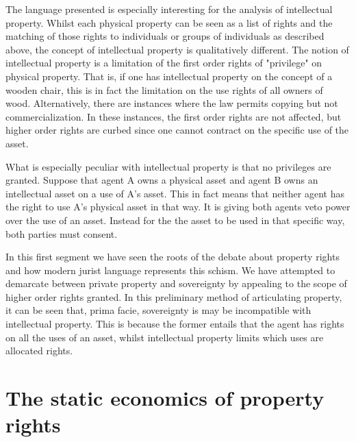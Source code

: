 The language presented is especially interesting for the analysis of intellectual property. Whilst each physical property can be seen as a list of rights and the matching of those rights to individuals or groups of individuals as described above, the concept of intellectual property is qualitatively different. The notion of intellectual property is a limitation of the first order rights of "privilege" on physical property. That is, if one has intellectual property on the concept of a wooden chair, this is in fact the limitation on the use rights of all owners of wood. Alternatively, there are instances where the law permits copying but not commercialization. In these instances, the first order rights are not affected, but higher order rights are curbed since one cannot contract on the specific use of the asset. 

What is especially peculiar with intellectual property is that no privileges are granted. Suppose that agent A owns a physical asset and agent B owns an intellectual asset on a use of A's asset. This in fact means that neither agent has the right to use A's physical asset in that way. It is giving both agents veto power over the use of an asset. Instead for the the asset to be used in that specific way, both parties must consent. 

In this first segment we have seen the roots of the debate about property rights and how modern jurist language represents this schism. We have attempted to demarcate between private property and sovereignty by appealing to the scope of higher order rights granted. In this preliminary method of articulating property, it can be seen that, prima facie, sovereignty is may be incompatible with intellectual property. This is because the former entails that the agent has rights on all the uses of an asset, whilst intellectual property limits which uses are allocated rights. 

\section{The static economics of property rights}\label{static}

